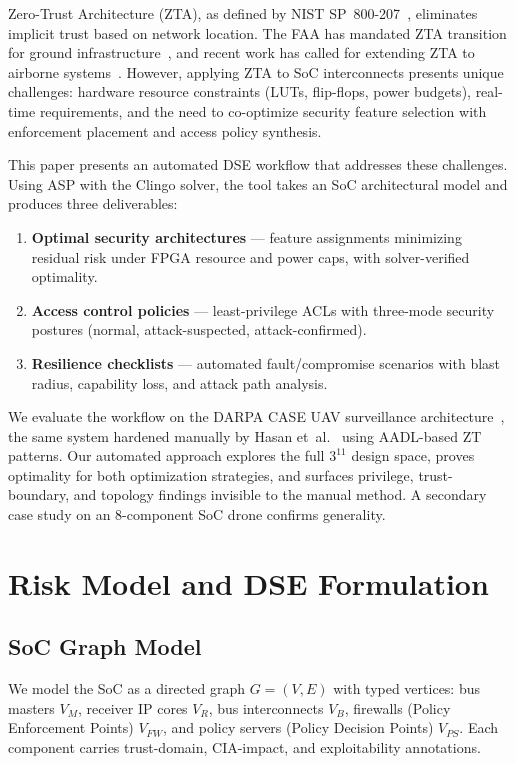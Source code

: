 \documentclass[conference]{IEEEtran}
\begin{document}
Zero-Trust Architecture (ZTA), as defined by NIST SP~800-207~\cite{nist_zta},
eliminates implicit trust based on network location. The FAA has mandated
ZTA transition for ground infrastructure~\cite{faa_zt}, and recent work
has called for extending ZTA to airborne systems~\cite{ztas_dasc}. However,
applying ZTA to SoC interconnects presents unique challenges: hardware
resource constraints (LUTs, flip-flops, power budgets), real-time
requirements, and the need to co-optimize security feature selection with
enforcement placement and access policy synthesis.

This paper presents an automated DSE workflow that addresses these
challenges. Using ASP with the Clingo solver, the tool takes an SoC
architectural model and produces three deliverables:
\begin{enumerate}
\item \textbf{Optimal security architectures} --- feature assignments
  minimizing residual risk under FPGA resource and power caps, with
  solver-verified optimality.
\item \textbf{Access control policies} --- least-privilege ACLs with
  three-mode security postures (normal, attack-suspected,
  attack-confirmed).
\item \textbf{Resilience checklists} --- automated fault/compromise
  scenarios with blast radius, capability loss, and attack path analysis.
\end{enumerate}

We evaluate the workflow on the DARPA CASE UAV surveillance
architecture~\cite{darpa_case}, the same system hardened manually by
Hasan et~al.~\cite{hasan_saecps} using AADL-based ZT patterns. Our
automated approach explores the full $3^{11}$ design space, proves
optimality for both optimization strategies, and surfaces privilege,
trust-boundary, and topology findings invisible to the manual method.
A secondary case study on an 8-component SoC drone confirms generality.

\section{Risk Model and DSE Formulation}

\subsection{SoC Graph Model}
We model the SoC as a directed graph $G=(V,E)$ with typed vertices:
bus masters $V_M$, receiver IP cores $V_R$, bus interconnects $V_B$,
firewalls (Policy Enforcement Points) $V_{FW}$, and policy servers
(Policy Decision Points) $V_{PS}$. Each component carries trust-domain,
CIA-impact, and exploitability annotations.
\end{document}
